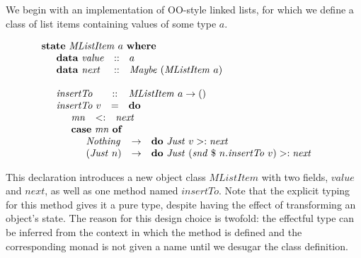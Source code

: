 \documentclass[runningheads,a4paper]{llncs}
\begin{document}
We begin with an implementation of OO-style linked lists, for which we define a class of list items containing values of some type $a$.

\begin{displaymath}
\begin{array}{l}
\mathbf{state}~\mathit{MListItem}~a~\mathbf{where} \\
\quad \begin{array}{lcl}
\mathbf{data}~\mathit{value} & :: & a \\
\mathbf{data}~\mathit{next}  & :: & \mathit{Maybe}~(\mathit{MListItem}~a)
\end{array}\\\\
\quad \begin{array}{lcl}
\mathit{insertTo} & :: & \mathit{MListItem}~a \to ()\\
\mathit{insertTo}~v & = & \mathbf{do} \\
\multicolumn{3}{l}{\quad \begin{array}{lcl}
\mathit{mn} & <: & \mathit{next} \\
\multicolumn{3}{l}{\mathbf{case}~\mathit{mn}~\mathbf{of}} \\
\multicolumn{3}{l}{\quad \begin{array}{lcl}
\mathit{Nothing} & \to & \mathbf{do}~\mathit{Just}~v >: \mathit{next} \\
(\mathit{Just}~n) & \to & \mathbf{do}~\mathit{Just}~(\mathit{snd}~\$~n.\mathit{insertTo}~v) >: \mathit{next}
\end{array}}
\end{array}}
\end{array}
\end{array}
\end{displaymath}

This declaration introduces a new object class $\mathit{MListItem}$ with two fields, $\mathit{value}$ and $\mathit{next}$, as well as one method named $\mathit{insertTo}$. Note that the explicit typing for this method gives it a pure type, despite having the effect of transforming an object's state. The reason for this design choice is twofold: the effectful type can be inferred from the context in which the method is defined and the corresponding monad is not given a name until we desugar the class definition. %
\end{document}
